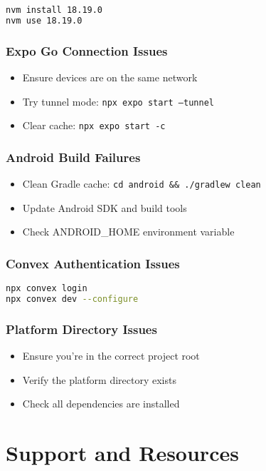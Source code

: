 \documentclass[11pt,a4paper]{article}
\begin{document}
\begin{lstlisting}[language=bash]
nvm install 18.19.0
nvm use 18.19.0
\end{lstlisting}

\subsubsection{Expo Go Connection Issues}
\begin{itemize}
    \item Ensure devices are on the same network
    \item Try tunnel mode: \texttt{npx expo start --tunnel}
    \item Clear cache: \texttt{npx expo start -c}
\end{itemize}

\subsubsection{Android Build Failures}
\begin{itemize}
    \item Clean Gradle cache: \texttt{cd android \&\& ./gradlew clean}
    \item Update Android SDK and build tools
    \item Check ANDROID\_HOME environment variable
\end{itemize}

\subsubsection{Convex Authentication Issues}
\begin{lstlisting}[language=bash]
npx convex login
npx convex dev --configure
\end{lstlisting}

\subsubsection{Platform Directory Issues}
\begin{itemize}
    \item Ensure you're in the correct project root
    \item Verify the platform directory exists
    \item Check all dependencies are installed
\end{itemize}

\section{Support and Resources}
\end{document}
